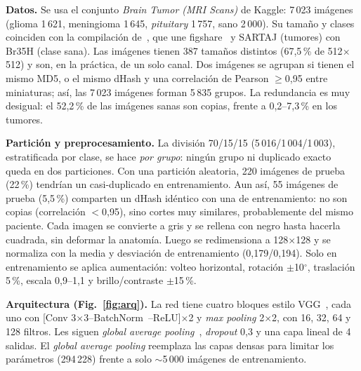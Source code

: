 \documentclass[letterpaper, 10 pt, conference]{ieeeconf}  %
\begin{document}
\textbf{Datos.} Se usa el conjunto \textit{Brain Tumor (MRI Scans)} de Kaggle: 7\,023 imágenes (glioma 1\,621, meningioma 1\,645, \textit{pituitary} 1\,757, sano 2\,000). Su tamaño y clases coinciden con la compilación de~\cite{c10}, que une figshare~\cite{c5} y SARTAJ (tumores) con Br35H (clase sana). Las imágenes tienen 387 tamaños distintos (67,5\,\% de 512$\times$512) y son, en la práctica, de un solo canal. Dos imágenes se agrupan si tienen el mismo MD5, o el mismo dHash y una correlación de Pearson $\geq$0,95 entre miniaturas; así, las 7\,023 imágenes forman 5\,835 grupos. La redundancia es muy desigual: el 52,2\,\% de las imágenes sanas son copias, frente a 0,2--7,3\,\% en los tumores.

\textbf{Partición y preprocesamiento.} La división 70/15/15 (5\,016/1\,004/1\,003), estratificada por clase, se hace \textit{por grupo}: ningún grupo ni duplicado exacto queda en dos particiones. Con una partición aleatoria, 220 imágenes de prueba (22\,\%) tendrían un casi-duplicado en entrenamiento. Aun así, 55 imágenes de prueba (5,5\,\%) comparten un dHash idéntico con una de entrenamiento: no son copias (correlación $<$0,95), sino cortes muy similares, probablemente del mismo paciente. Cada imagen se convierte a gris y se rellena con negro hasta hacerla cuadrada, sin deformar la anatomía. Luego se redimensiona a 128$\times$128 y se normaliza con la media y desviación de entrenamiento (0,179/0,194). Solo en entrenamiento se aplica aumentación: volteo horizontal, rotación $\pm$10$^\circ$, traslación 5\,\%, escala 0,9--1,1 y brillo/contraste $\pm$15\,\%.

\textbf{Arquitectura (Fig.~\ref{fig:arq}).} La red tiene cuatro bloques estilo VGG~\cite{c2}, cada uno con [Conv 3$\times$3--BatchNorm~\cite{c3}--ReLU]$\times$2 y \textit{max pooling} 2$\times$2, con 16, 32, 64 y 128 filtros. Les siguen \textit{global average pooling}~\cite{c11}, \textit{dropout} 0,3 y una capa lineal de 4 salidas. El \textit{global average pooling} reemplaza las capas densas para limitar los parámetros (294\,228) frente a solo $\sim$5\,000 imágenes de entrenamiento.
\end{document}

